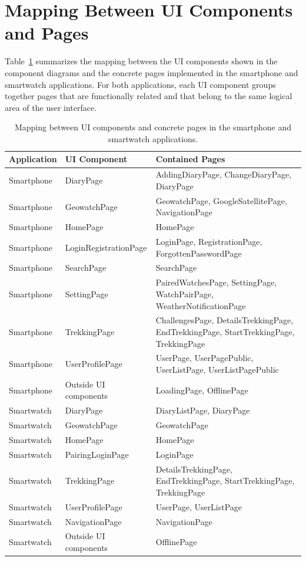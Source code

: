 \section{Mapping Between UI Components and Pages}
Table~\ref{tab:ui-components-pages} summarizes the mapping between the UI components shown in the component diagrams and the concrete pages implemented in the smartphone and smartwatch applications. For both applications, each UI component groups together pages that are functionally related and that belong to the same logical area of the user interface.
\begin{table}[H]
\centering
\small
\renewcommand{\arraystretch}{1.2}
\begin{tabular}{|p{2.6cm}|p{3.4cm}|p{8.2cm}|}
\hline
\textbf{Application} & \textbf{UI Component} & \textbf{Contained Pages} \\
\hline
Smartphone & DiaryPage & AddingDiaryPage, ChangeDiaryPage, DiaryPage \\
\hline
Smartphone & GeowatchPage & GeowatchPage, GoogleSatellitePage, NavigationPage \\
\hline
Smartphone & HomePage & HomePage \\
\hline
Smartphone & LoginRegistrationPage & LoginPage, RegistrationPage, ForgottenPasswordPage \\
\hline
Smartphone & SearchPage & SearchPage \\
\hline
Smartphone & SettingPage & PairedWatchesPage, SettingPage, WatchPairPage, WeatherNotificationPage \\
\hline
Smartphone & TrekkingPage & ChallengesPage, DetailsTrekkingPage, EndTrekkingPage, StartTrekkingPage, TrekkingPage \\
\hline
Smartphone & UserProfilePage & UserPage, UserPagePublic, UserListPage, UserListPagePublic \\
\hline
Smartphone & Outside UI components & LoadingPage, OfflinePage \\
\hline
Smartwatch & DiaryPage & DiaryListPage, DiaryPage \\
\hline
Smartwatch & GeowatchPage & GeowatchPage \\
\hline
Smartwatch & HomePage & HomePage \\
\hline
Smartwatch & PairingLoginPage & LoginPage \\
\hline
Smartwatch & TrekkingPage & DetailsTrekkingPage, EndTrekkingPage, StartTrekkingPage, TrekkingPage \\
\hline
Smartwatch & UserProfilePage & UserPage, UserListPage \\
\hline
Smartwatch & NavigationPage & NavigationPage \\
\hline
Smartwatch & Outside UI components & OfflinePage \\
\hline
\end{tabular}
\caption{Mapping between UI components and concrete pages in the smartphone and smartwatch applications.}
\label{tab:ui-components-pages}
\end{table}

